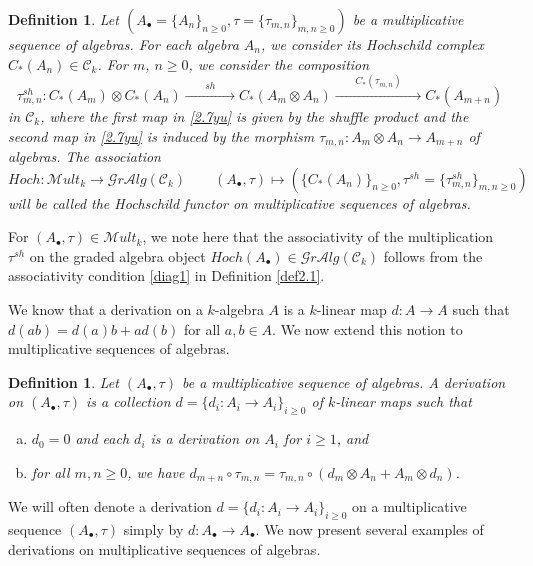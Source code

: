 \documentclass[10pt, colorlinks]{article}
\numberwithin{equation}{section} \DeclareMathSizes{2}{10}{12}{13}
\newtheorem{defn}[thm]{Definition}
\begin{document}
\begin{defn}\label{DL2.2xr} Let $({A}_\bullet=\{A_n\}_{n\geq 0},\tau=\{\tau_{m,n}\}_{m,n\geq 0})$ be a multiplicative sequence of algebras.  For each 
algebra $A_n$, we consider its Hochschild complex $C_*(A_n)\in \mathcal C_k$. For $m$, $n\geq 0$, we consider the composition
\begin{equation}\label{2.7yu}
\tau_{m,n}^{sh}:C_*(A_m)\otimes C_*(A_n)\xrightarrow{\qquad sh\qquad }C_*(A_m\otimes A_n)\xrightarrow{\qquad C_*(\tau_{m,n})\qquad}C_*(A_{m+n})
\end{equation} in $\mathcal C_k$, where the first map in \eqref{2.7yu} is given by the shuffle product and the second map in \eqref{2.7yu} is induced by the morphism $\tau_{m,n}: A_m\otimes A_n\longrightarrow A_{m+n}$ of algebras. The association
\begin{equation} Hoch:\mathscr{M}ult_k\longrightarrow \mathscr Gr\mathcal Alg(\mathcal C_k) \qquad ({A}_\bullet,\tau) \mapsto (\{C_*(A_n)\}_{n\geq0},\tau^{sh}=\{\tau^{sh}_{m,n}\}_{m,n\geq 0})
\end{equation} will be called the Hochschild functor on multiplicative sequences of algebras. 
\end{defn}

For $({A}_\bullet,\tau)\in \mathscr{M}ult_k$, we note here that the associativity of the multiplication $\tau^{sh}$ on the graded algebra object $Hoch(A_\bullet)\in  \mathscr Gr\mathcal Alg(\mathcal C_k)$ follows from the associativity condition \eqref{diag1} in Definition \ref{def2.1}.  




\smallskip

We know that a derivation on a $k$-algebra $A$ is a $k$-linear map $d:A\longrightarrow A$ such that $d(ab)=d(a)b+ad(b)$ for all $a,b\in A$. We now extend this notion to multiplicative sequences of algebras.
    
  

\begin{defn}\label{D2.Xr}
    Let $({A}_\bullet,\tau)$ be a multiplicative sequence of algebras. A derivation on $({A}_\bullet,\tau)$ is a collection $d=\{d_i:A_i\longrightarrow A_i\}_{i\geq 0}$ of $k$-linear maps such that 
    \begin{enumerate}[(a)]
        \item $d_0=0$ and each $d_i$ is a derivation on $A_i$ for  $i\geq 1$, and
        \item for all $m,n\geq 0$,  we have 
       $
            d_{m+n}\circ\tau_{m,n}=\tau_{m,n}\circ (d_{m}\otimes A_n+A_m\otimes d_n)
       $.
    \end{enumerate}
    
\end{defn}
We will often denote  a derivation $d=\{d_i:A_i\longrightarrow A_i\}_{i\geq 0}$ on a multiplicative sequence $({A}_\bullet,\tau)$ simply by $d:{A}_\bullet\longrightarrow {A}_\bullet$. We now present several examples of derivations on multiplicative sequences of algebras. 
\end{document}
